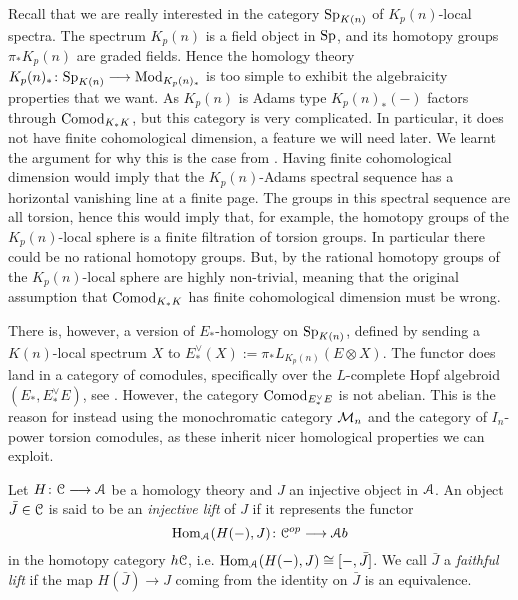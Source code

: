 \begin{remark}
    Recall that we are really interested in the category $\mathrm{Sp}_{K(n)}$ of $K_p(n)$-local spectra. The spectrum $K_p(n)$ is a field object in $\mathrm{Sp}$, and its homotopy groups $\pi_* K_p(n)$ are graded fields. Hence the homology theory $K_p(n)_*\colon \mathrm{Sp}_{K(n)}\longrightarrow \mathrm{Mod}_{K_p(n)_*}$ is too simple to exhibit the algebraicity properties that we want. As $K_p(n)$ is Adams type $K_p(n)_*(-)$ factors through $\mathrm{Comod}_{K_*K}$, but this category is very complicated. In particular, it does not have finite cohomological dimension, a feature we will need later. We learnt the argument for why this is the case from \cite{barthel-pstragowski_2021}. Having finite cohomological dimension would imply that the $K_p(n)$-Adams spectral sequence has a horizontal vanishing line at a finite page. The groups in this spectral sequence are all torsion, hence this would imply that, for example, the homotopy groups of the $K_p(n)$-local sphere is a finite filtration of torsion groups. In particular there could be no rational homotopy groups. But, by \cite{barthel_schlank_stapleton_weinstein_2024} the rational homotopy groups of the $K_p(n)$-local sphere are highly non-trivial, meaning that the original assumption that $\mathrm{Comod}_{K_*K}$ has finite cohomological dimension must be wrong. 
    
    There is, however, a version of $E_*$-homology on $\mathrm{Sp}_{K(n)}$, defined by sending a $K(n)$-local spectrum $X$ to $E_*^\vee (X) := \pi_*L_{K_p(n)}(E\otimes X)$. The functor does land in a category of comodules, specifically over the $L$-complete Hopf algebroid $(E_*, E_*^\vee E)$, see \cite[5.3]{baker_2009}. However, the category $\mathrm{Comod}_{E_*^\vee E}$ is not abelian. This is the reason for instead using the monochromatic category $\mathcal{M}_{n}$ and the category of $I_n$-power torsion comodules, as these inherit nicer homological properties we can exploit. 
\end{remark}

\begin{definition}
    \label{ch2:def:faithful-lift}
    Let $H\colon \EuScript{C}\longrightarrow \EuScript{A}$ be a homology theory and $J$ an injective object in $\EuScript{A}$. An object $\bar{J}\in \EuScript{C}$ is said to be an \emph{injective lift} of $J$ if it represents the functor 
    $$\operatorname{Hom}_{\EuScript{A}}(H(-),J)\colon \EuScript{C}^{op}\longrightarrow \EuScript{A} b$$
    in the homotopy category $h \EuScript{C}$, i.e. $\operatorname{Hom}_{\EuScript{A}}(H(-),J)\cong [-,\bar{J}]$. We call $\bar{J}$ a \emph{faithful lift} if the map $H(\bar{J})\longrightarrow J$ coming from the identity on $\bar{J}$ is an equivalence. 
\end{definition}

